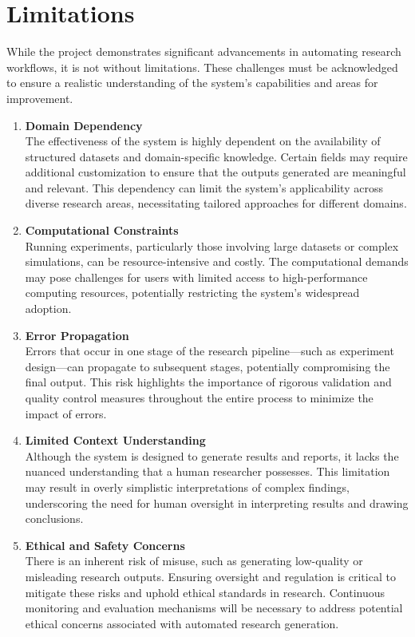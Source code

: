 \section{Limitations}
While the project demonstrates significant advancements in automating research workflows, it is not without limitations. These challenges must be acknowledged to ensure a realistic understanding of the system's capabilities and areas for improvement.
\begin{enumerate}
    \item \textbf{Domain Dependency}\\
    The effectiveness of the system is highly dependent on the availability of structured datasets and domain-specific knowledge. Certain fields may require additional customization to ensure that the outputs generated are meaningful and relevant. This dependency can limit the system's applicability across diverse research areas, necessitating tailored approaches for different domains.

    \item \textbf{Computational Constraints}\\
    Running experiments, particularly those involving large datasets or complex simulations, can be resource-intensive and costly. The computational demands may pose challenges for users with limited access to high-performance computing resources, potentially restricting the system's widespread adoption.

    \item \textbf{Error Propagation}\\
    Errors that occur in one stage of the research pipeline—such as experiment design—can propagate to subsequent stages, potentially compromising the final output. This risk highlights the importance of rigorous validation and quality control measures throughout the entire process to minimize the impact of errors.

    \item \textbf{Limited Context Understanding}\\
    Although the system is designed to generate results and reports, it lacks the nuanced understanding that a human researcher possesses. This limitation may result in overly simplistic interpretations of complex findings, underscoring the need for human oversight in interpreting results and drawing conclusions.

    \item \textbf{Ethical and Safety Concerns}\\
    There is an inherent risk of misuse, such as generating low-quality or misleading research outputs. Ensuring oversight and regulation is critical to mitigate these risks and uphold ethical standards in research. Continuous monitoring and evaluation mechanisms will be necessary to address potential ethical concerns associated with automated research generation.
\end{enumerate} 